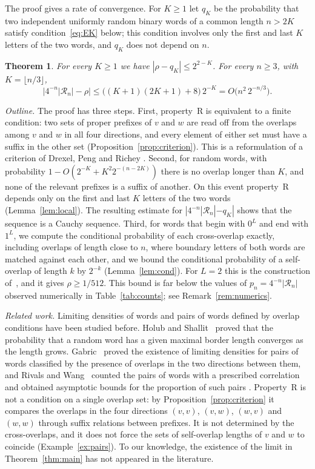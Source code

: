 \documentclass[11pt]{amsart}
\newtheorem{theorem}{Theorem}[section]
\theoremstyle{remark}
\numberwithin{equation}{section}
\newcommand{\R}{\mathcal{R}}
\begin{document}
The proof gives a rate of convergence. For $K\ge1$ let $q_K$ be the probability that two independent uniformly random binary words of a common length $n>2K$ satisfy condition~\eqref{eq:EK} below; this condition involves only the first and last $K$ letters of the two words, and $q_K$ does not depend on $n$.

\begin{theorem}\label{thm:rate}
For every $K\ge1$ we have $|\rho-q_K|\le 2^{2-K}$. For every $n\ge3$, with $K=\lfloor n/3\rfloor$,
\[
  \bigl|4^{-n}|\R_n|-\rho\bigr|\le \bigl((K+1)(2K+1)+8\bigr)\,2^{-K}=O\bigl(n^{2}\,2^{-n/3}\bigr).
\]
\end{theorem}

\emph{Outline.} The proof has three steps. First, property~R is equivalent to a finite condition: two sets of proper prefixes of $v$ and $w$ are read off from the overlaps among $v$ and $w$ in all four directions, and every element of either set must have a suffix in the other set (Proposition~\ref{prop:criterion}). This is a reformulation of a criterion of Drexel, Peng and Richey \cite[Lemma~19]{DPR}. Second, for random words, with probability $1-O(2^{-K}+K^{2}2^{-(n-2K)})$ there is no overlap longer than $K$, and none of the relevant prefixes is a suffix of another. On this event property~R depends only on the first and last $K$ letters of the two words (Lemma~\ref{lem:local}). The resulting estimate for $|4^{-n}|\R_n|-q_K|$ shows that the sequence is a Cauchy sequence. Third, for words that begin with $0^L$ and end with $1^L$, we compute the conditional probability of each cross-overlap exactly, including overlaps of length close to $n$, where boundary letters of both words are matched against each other, and we bound the conditional probability of a self-overlap of length $k$ by $2^{-k}$ (Lemma~\ref{lem:cond}). For $L=2$ this is the construction of~\cite{BMR}, and it gives $\rho\ge1/512$. This bound is far below the values of $p_n=4^{-n}|\R_n|$ observed numerically in Table~\ref{tab:counts}; see Remark~\ref{rem:numerics}.

\emph{Related work.} Limiting densities of words and pairs of words defined by overlap conditions have been studied before. Holub and Shallit~\cite[Theorem~3]{HS} proved that the probability that a random word has a given maximal border length converges as the length grows. Gabric~\cite[Theorem~10 and Corollaries~11--12]{Gab} proved the existence of limiting densities for pairs of words classified by the presence of overlaps in the two directions between them, and Rivals and Wang~\cite{RW} counted the pairs of words with a prescribed correlation and obtained asymptotic bounds for the proportion of such pairs \cite[Theorem~22]{RW}. Property~R is not a condition on a single overlap set: by Proposition~\ref{prop:criterion} it compares the overlaps in the four directions $(v,v)$, $(v,w)$, $(w,v)$ and $(w,w)$ through suffix relations between prefixes. It is not determined by the cross-overlaps, and it does not force the sets of self-overlap lengths of $v$ and $w$ to coincide (Example~\ref{ex:pairs}). To our knowledge, the existence of the limit in Theorem~\ref{thm:main} has not appeared in the literature.
\end{document}
